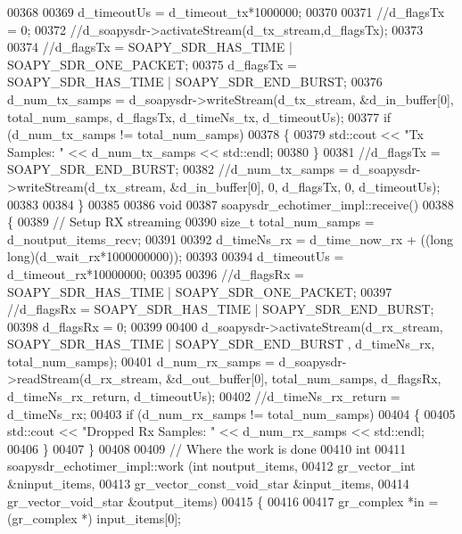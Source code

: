 \begin{DoxyCode}
00368 
00369       d_timeoutUs = d_timeout_tx*1000000;
00370 
00371       \textcolor{comment}{//d\_flagsTx = 0;}
00372       \textcolor{comment}{//d\_soapysdr->activateStream(d\_tx\_stream,d\_flagsTx);}
00373 
00374       \textcolor{comment}{//d\_flagsTx =  SOAPY\_SDR\_HAS\_TIME  | SOAPY\_SDR\_ONE\_PACKET;}
00375       d_flagsTx =  SOAPY_SDR_HAS_TIME | SOAPY_SDR_END_BURST;
00376       d_num_tx_samps = d_soapysdr->writeStream(d_tx_stream, &d_in_buffer[0], total\_num\_samps, 
      d_flagsTx, d_timeNs_tx, d\_timeoutUs);
00377       \textcolor{keywordflow}{if} (d_num_tx_samps != total\_num\_samps)
00378       \{
00379         std::cout << \textcolor{stringliteral}{"Tx Samples: "} << d_num_tx_samps << std::endl;
00380       \}
00381       \textcolor{comment}{//d\_flagsTx = SOAPY\_SDR\_END\_BURST;}
00382       \textcolor{comment}{//d\_num\_tx\_samps = d\_soapysdr->writeStream(d\_tx\_stream, &d\_in\_buffer[0], 0, d\_flagsTx, 0,
       d\_timeoutUs);}
00383 
00384     \}
00385 
00386     \textcolor{keywordtype}{void}
00387     soapysdr_echotimer_impl::receive()
00388     \{
00389       \textcolor{comment}{// Setup RX streaming}
00390       \textcolor{keywordtype}{size\_t} total\_num\_samps = d_noutput_items_recv;
00391 
00392       d_timeNs_rx = d_time_now_rx + ((\textcolor{keywordtype}{long} long)(d_wait_rx*1000000000));
00393 
00394       d_timeoutUs = d_timeout_rx*10000000;
00395 
00396       \textcolor{comment}{//d\_flagsRx =  SOAPY\_SDR\_HAS\_TIME | SOAPY\_SDR\_ONE\_PACKET;}
00397       \textcolor{comment}{//d\_flagsRx =  SOAPY\_SDR\_HAS\_TIME | SOAPY\_SDR\_END\_BURST;}
00398       d_flagsRx =  0;
00399 
00400       d_soapysdr->activateStream(d_rx_stream, SOAPY_SDR_HAS_TIME | 
      SOAPY_SDR_END_BURST , d_timeNs_rx, total\_num\_samps);
00401       d_num_rx_samps = d_soapysdr->readStream(d_rx_stream, &d_out_buffer[0], total\_num\_samps, 
      d_flagsRx, d_timeNs_rx_return, d\_timeoutUs);
00402       \textcolor{comment}{//d\_timeNs\_rx\_return = d\_timeNs\_rx;}
00403       \textcolor{keywordflow}{if} (d_num_rx_samps != total\_num\_samps)
00404       \{
00405       std::cout << \textcolor{stringliteral}{"Dropped Rx Samples: "} << d_num_rx_samps << std::endl;
00406       \}
00407     \}
00408 
00409   \textcolor{comment}{// Where the work is done}
00410     \textcolor{keywordtype}{int}
00411     soapysdr_echotimer_impl::work (\textcolor{keywordtype}{int} noutput\_items,
00412     gr\_vector\_int &ninput\_items,
00413     gr\_vector\_const\_void\_star &input\_items,
00414     gr\_vector\_void\_star &output\_items)
00415     \{
00416 
00417       gr\_complex *in = (gr\_complex *) input\_items[0];

\end{DoxyCode}
